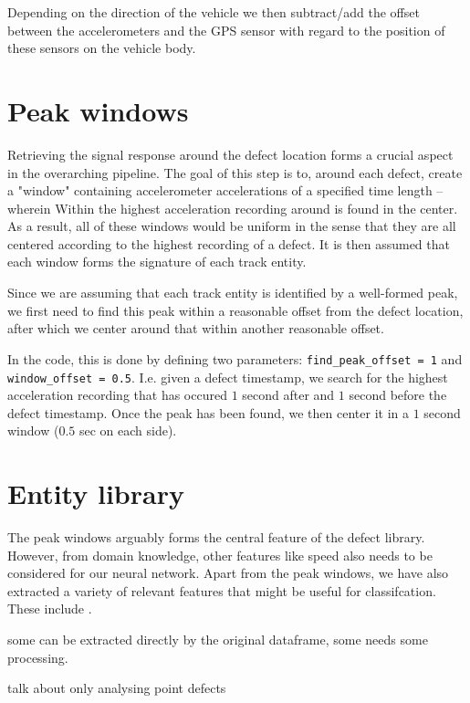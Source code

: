 Depending on the direction of the vehicle we then subtract/add the offset between the accelerometers and the GPS sensor with regard to the position of these sensors on the vehicle body.


\section{Peak windows}
Retrieving the signal response around the defect location forms a crucial aspect in the overarching pipeline. The goal of this step is to, around each defect, create a "window" containing accelerometer accelerations of a specified time length -- wherein Within the highest acceleration recording around is found in the center. As a result, all of these windows would be uniform in the sense that they are all centered according to the highest recording of a defect. It is then assumed that each window forms the signature of each track entity. 

Since we are assuming that each track entity is identified by a well-formed peak, we first need to find this peak within a reasonable offset from the defect location, after which we center around that within another reasonable offset. 

In the code, this is done by defining two parameters: \verb|find_peak_offset = 1| and \verb|window_offset = 0.5|. I.e. given a defect timestamp, we search for the highest acceleration recording that has occured $1$ second after and $1$ second before the defect timestamp. Once the peak has been found, we then center it in a $1$ second window ($0.5$ sec on each side).


\section{Entity library}
The peak windows arguably forms the central feature of the defect library. However, from domain knowledge, other features like speed also needs to be considered for our neural network. Apart from the peak windows, we have also extracted a variety of relevant features that might be useful for classifcation. These include .

some can be extracted directly by the original dataframe, some needs some processing.

talk about only analysing point defects

